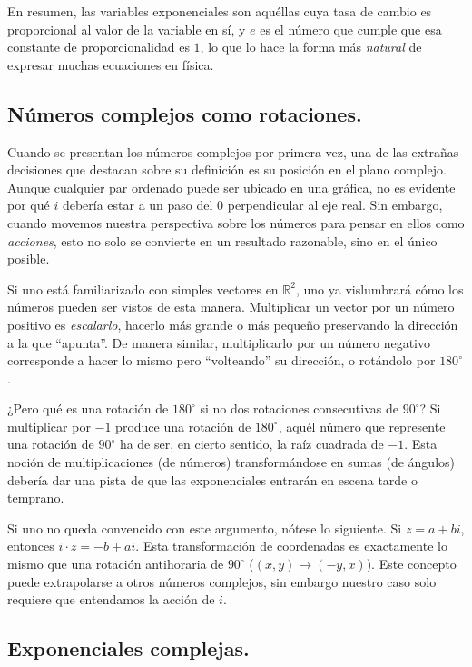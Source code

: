 En resumen, las variables exponenciales son aquéllas cuya tasa de cambio es proporcional al valor de la variable en sí, y $e$ es el número que cumple que esa constante de proporcionalidad es $1$, lo que lo hace la forma más \textit{natural} de expresar muchas ecuaciones en física.

\subsection{Números complejos como rotaciones.}

Cuando se presentan los números complejos por primera vez, una de las extrañas decisiones que destacan sobre su definición es su posición en el plano complejo. Aunque cualquier par ordenado puede ser ubicado en una gráfica, no es evidente por qué $i$ debería estar a un paso del $0$ perpendicular al eje real. Sin embargo, cuando movemos nuestra perspectiva sobre los números para pensar en ellos como \textit{acciones}, esto no solo se convierte en un resultado razonable, sino en el único posible.

Si uno está familiarizado con simples vectores en $\mathbb{R}^2$, uno ya vislumbrará cómo los números pueden ser vistos de esta manera. Multiplicar un vector por un número positivo es \textit{escalarlo}, hacerlo más grande o más pequeño preservando la dirección a la que \enquote{apunta}. De manera similar, multiplicarlo por un número negativo corresponde a hacer lo mismo pero \enquote{volteando} su dirección, o rotándolo por $180^{\circ}$.

¿Pero qué es una rotación de $180^{\circ}$ si no dos rotaciones consecutivas de $90^{\circ}$? Si multiplicar por $-1$ produce una rotación de $180^{\circ}$, aquél número que represente una rotación de $90^{\circ}$ ha de ser, en cierto sentido, la raíz cuadrada de $-1$. Esta noción de multiplicaciones (de números) transformándose en sumas (de ángulos) debería dar una pista de que las exponenciales entrarán en escena tarde o temprano.

Si uno no queda convencido con este argumento, nótese lo siguiente. Si $z = a + bi$, entonces $i\cdot z = -b + ai$. Esta transformación de coordenadas es exactamente lo mismo que una rotación antihoraria de $90^{\circ}$ ($(x, y) \to (-y, x)$). Este concepto puede extrapolarse a otros números complejos, sin embargo nuestro caso solo requiere que entendamos la acción de $i$.

\subsection{Exponenciales complejas.}


